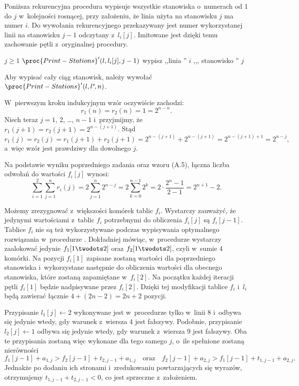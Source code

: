 
\exercise %
Poniższa rekurencyjna procedura wypisuje wszystkie stanowiska o~numerach od 1 do $j$ w~kolejności rosnącej, przy założeniu, że linia użyta na stanowisku $j$ ma numer $i$.
Do wywołania rekurencyjnego przekazywany jest numer wykorzystanej linii na stanowisku $j-1$ odczytany z~$l_i[j]$.
Imitowane jest dzięki temu zachowanie pętli z~oryginalnej procedury.
\begin{codebox}
\li	\If $j\ge1$
\li	\Then $\proc{Print-Stations}'(l,l_i[j],j-1)$
\li		wypisz ,,linia '' $i$ ,,{}, stanowisko '' $j$
	\End
\end{codebox}
Aby wypisać cały ciąg stanowisk, należy wywołać $\proc{Print-Stations}'(l,l^*\!,n)$.

\exercise %
W~pierwszym kroku indukcyjnym wzór oczywiście zachodzi:
\[
	r_1(n) = r_2(n) = 1 = 2^{n-n}.
\]
Niech teraz $j=1$, 2, \dots, $n-1$ i~przyjmijmy, że $r_1(j+1)=r_2(j+1)=2^{n-(j+1)}$.
Stąd
\[
	r_1(j) = r_2(j) = r_1(j+1)+r_2(j+1) = 2^{n-(j+1)}+2^{n-(j+1)} = 2^{n-(j+1)+1} = 2^{n-j},
\]
a~więc wzór jest prawdziwy dla dowolnego $j$.

\exercise %
Na podstawie wyniku poprzedniego zadania oraz wzoru (A.5), łączna liczba odwołań do wartości $f_i[j]$ wynosi:
\[
	\sum_{i=1}^2\sum_{j=1}^nr_i(j) = 2\sum_{j=1}^n2^{n-j} = 2\sum_{k=0}^{n-1}2^k = 2\cdot\frac{2^n-1}{2-1} = 2^{n+1}-2.
\]

\exercise %
Możemy zrezygnować z~większości komórek tablic $f_i$.
Wystarczy zauważyć, że jedynymi wartościami z~tablic $f_i$ potrzebnymi do obliczenia $f_i[j]$ są $f_i[j-1]$.
Tablice $f_i$ nie są też wykorzystywane podczas wypisywania optymalnego rozwiązania w~procedurze .
Dokładniej mówiąc, w~procedurze  wystarczy zaalokować jedynie $f_1[1\twodots2]$ oraz $f_2[1\twodots2]$, czyli w~sumie 4 komórki.
Na pozycji $f_i[1]$ zapisane zostaną wartości dla poprzedniego stanowiska i~wykorzystane następnie do obliczenia wartości dla obecnego stanowiska, które zostaną zapamiętane w~$f_i[2]$.
Na początku każdej iteracji pętli  $f_i[1]$ będzie nadpisywane przez $f_i[2]$.
Dzięki tej modyfikacji tablice $f_i$ i~$l_i$ będą zawierać łącznie $4+(2n-2)=2n+2$ pozycji.

\exercise %
Przypisanie $l_1[j]\gets2$ wykonywane jest w~procedurze  tylko w~linii 8 i~odbywa się jedynie wtedy, gdy warunek z~wiersza 4 jest fałszywy.
Podobnie, przypisanie $l_2[j]\gets1$ odbywa się jedynie wtedy, gdy warunek z~wiersza 9 jest fałszywy.
Oba te przypisania zostaną więc wykonane dla tego samego $j$, o~ile spełnione zostaną nierówności
\[
	f_1[j-1]+a_{1,j}>f_2[j-1]+t_{2,j-1}+a_{1,j} \quad\text{oraz}\quad f_2[j-1]+a_{2,j}>f_1[j-1]+t_{1,j-1}+a_{2,j}.
\]
Jednakże po dodaniu ich stronami i~zredukowaniu powtarzających się wyrazów, otrzymujemy $t_{1,j-1}+t_{2,j-1}<0$, co jest sprzeczne z~założeniem.
